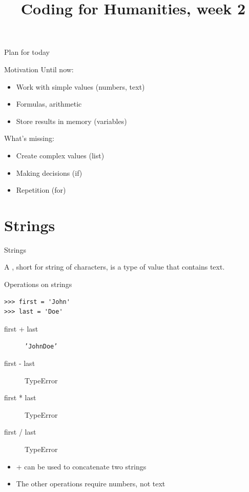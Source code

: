 \documentclass[aspectratio=169,usenames,dvipsnames]{beamer}
\title{Coding for Humanities, week 2}
\begin{document}
\begin{frame}
    \titlepage
\end{frame}

\begin{frame}{Plan for today}
    \tableofcontents
\end{frame}

\begin{frame}{Motivation}
    Until now:
    \begin{itemize}
        \item Work with simple values (numbers, text)
        \item Formulas, arithmetic
        \item Store results in memory (variables)
    \end{itemize}

    \pause
    What's missing:
    \begin{itemize}
        \item Create complex values (list)
        \item Making decisions (if)
        \item Repetition (for)
    \end{itemize}
\end{frame}

\section{Strings}
\frame{\tableofcontents[currentsection]}

\begin{frame}{Strings}
    \begin{definition}
        A , short for string of characters,
        is a type of value that contains text.
    \end{definition}

\end{frame}

\begin{frame}[fragile]{Operations on strings}
\begin{lstlisting}
>>> first = 'John'
>>> last = 'Doe'
\end{lstlisting}
\begin{description}
    \item[first + last] \texttt{'JohnDoe'}
    \item[first - last] TypeError
    \item[first * last] TypeError
    \item[first / last] TypeError
\end{description}

\begin{itemize}
\item + can be used to concatenate two strings
\item The other operations require numbers, not text
\end{itemize}
\end{frame}
\end{document}
